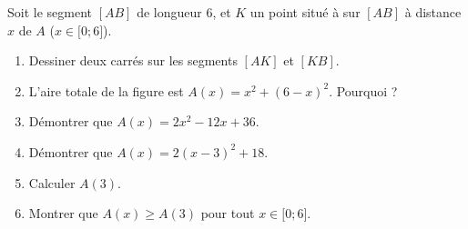 
\begin{exercice}\label{exosmath-0046}

    Soit le segment \( [AB]\) de longueur \( 6\), et \( K\) un point situé à sur \( [AB]\) à distance \( x\) de \( A\) (\( x\in\mathopen[  0; 6 \mathclose]\)).
    \begin{multicols}{2}
    \begin{enumerate}
        \item
            Dessiner deux carrés sur les segments \( [AK]\) et \( [KB]\).
        \item
            L'aire totale de la figure est \( A(x)=x^2+(6-x)^2\). Pourquoi ?
        \item
            Démontrer que \( A(x)=2x^2-12x+36\).
        \item
            Démontrer que \( A(x)=2(x-3)^2+18\).
        \item
            Calculer \( A(3)\).
        \item
            Montrer que \( A(x)\geq A(3)\) pour tout \( x\in \mathopen[ 0; 6 \mathclose]\).
    \end{enumerate}
    \end{multicols}

\end{exercice}
